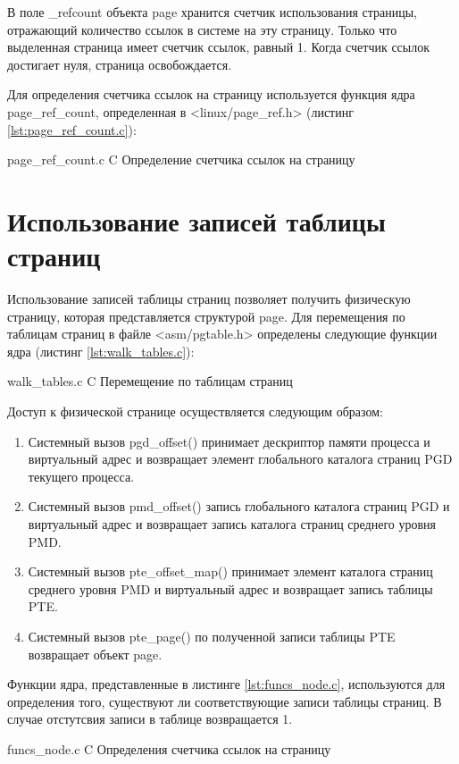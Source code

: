 В поле \_refcount объекта page хранится счетчик использования страницы, отражающий количество ссылок в системе на эту страницу. Только что выделенная страница имеет счетчик ссылок, равный 1. Когда счетчик ссылок достигает нуля, страница освобождается.

Для определения счетчика ссылок на страницу используется функция ядра page\_ref\_count, определенная в <linux/page\_ref.h> (листинг \ref{lst:page_ref_count.c}):

    {page_ref_count.c}
    {C}
    {Определение счетчика ссылок на страницу}
    
\section{Использование записей таблицы страниц}

Использование записей таблицы страниц позволяет получить физическую страницу, которая представляется структурой page. Для перемещения по таблицам страниц в файле <asm/pgtable.h> определены следующие функции ядра (листинг \ref{lst:walk_tables.c}):

    {walk_tables.c}
    {C}
    {Перемещение по таблицам страниц}
    
Доступ к физической странице осуществляется следующим образом:

\begin{enumerate}
	\item Системный вызов pgd\_offset() принимает дескриптор памяти процесса и виртуальный адрес и возвращает элемент глобального каталога страниц PGD текущего процесса.
	\item Системный вызов pmd\_offset() запись глобального каталога страниц PGD и виртуальный адрес и возвращает запись каталога страниц среднего уровня PMD.
	\item Системный вызов pte\_offset\_map() принимает элемент каталога страниц среднего уровня PMD и виртуальный адрес и возвращает запись таблицы PTE.
	\item Системный вызов pte\_page() по полученной записи таблицы PTE возвращает объект page.
\end{enumerate}

Функции ядра, представленные в листинге \ref{lst:funcs_node.c}, используются для определения того, существуют ли соответствующие записи таблицы страниц. В случае отстутсвия записи в таблице возвращается 1.
    
    {funcs_node.c}
    {C}
    {Определения счетчика ссылок на страницу}
    
